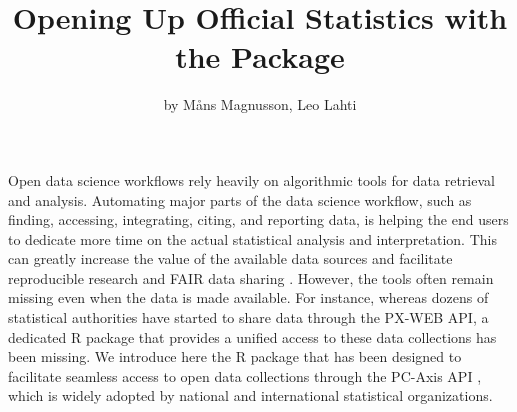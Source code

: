 \title{Opening Up Official Statistics with the  Package}
\author{by Måns Magnusson, Leo Lahti}


\maketitle





Open data science workflows rely heavily on algorithmic tools for data
retrieval and analysis. Automating major parts of the data science
workflow, such as finding, accessing, integrating, citing, and
reporting data, is helping the end users to dedicate more time on the
actual statistical analysis and interpretation. This can greatly
increase the value of the available data sources and facilitate
reproducible research \citep{Gandrud13, Boettiger2015} and FAIR data
sharing \cite{xxx}. However, the tools often remain missing even when
the data is made available. For instance, whereas dozens of
statistical authorities have started to share data through the PX-WEB
API, a dedicated R package that provides a unified access to these
data collections has been missing. We introduce here the  R
package that has been designed to facilitate seamless access to open
data collections through the PC-Axis API \cite{xxx}, which is widely
adopted by national and international statistical organizations.



